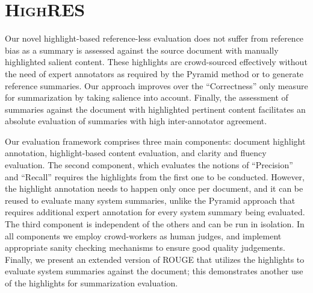 \documentclass[11pt,a4paper]{article}
\newcommand\highres{\textsc{HighRES}}
\begin{document}

\section{\highres}
\label{sec:highres}


Our novel highlight-based reference-less evaluation does not suffer from reference bias as a summary is assessed against the source document with manually highlighted salient content. These highlights are crowd-sourced effectively without the need of expert annotators as required by the Pyramid method \citep{Nenkova2004} or to generate reference summaries. Our approach improves over the ``Correctness'' only measure for summarization by taking salience into account. Finally, the assessment of summaries against the document with  highlighted pertinent content facilitates an absolute evaluation of summaries with high inter-annotator agreement. 

Our evaluation framework comprises three main components: document highlight annotation, highlight-based content evaluation, and 
clarity and fluency evaluation. The second component, which evaluates the notions of ``Precision'' and ``Recall'' requires the highlights from the first one to be conducted. However, the highlight annotation needs to happen only once per document, and it can be reused to evaluate many system summaries, unlike the Pyramid approach \citep{Nenkova2004} that requires additional expert annotation for every system summary being evaluated. The third component is independent of the others and can be run in isolation. In all components we employ crowd-workers as human judges, and implement appropriate sanity checking mechanisms to ensure good quality judgements. Finally, we present an extended version of ROUGE \cite{Lin2004} that utilizes the highlights to evaluate system summaries against the document; this demonstrates another use of the highlights for summarization evaluation. 
\end{document}
